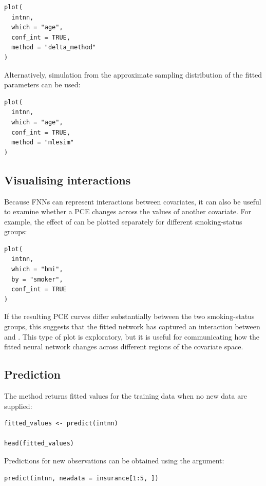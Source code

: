 \begin{verbatim}
plot(
  intnn,
  which = "age",
  conf_int = TRUE,
  method = "delta_method"
)
\end{verbatim}

Alternatively, simulation from the approximate sampling distribution of the fitted parameters can be used:

\begin{verbatim}
plot(
  intnn,
  which = "age",
  conf_int = TRUE,
  method = "mlesim"
)
\end{verbatim}

\subsection{Visualising interactions}\label{visualising-interactions}

Because FNNs can represent interactions between covariates, it can also be useful to examine whether a PCE changes across the values of another covariate.
For example, the effect of  can be plotted separately for different smoking-status groups:

\begin{verbatim}
plot(
  intnn,
  which = "bmi",
  by = "smoker",
  conf_int = TRUE
)
\end{verbatim}

If the resulting PCE curves differ substantially between the two smoking-status groups, this suggests that the fitted network has captured an interaction between  and .
This type of plot is exploratory, but it is useful for communicating how the fitted neural network changes across different regions of the covariate space.

\subsection{Prediction}\label{prediction-1}

The  method returns fitted values for the training data when no new data are supplied:

\begin{verbatim}
fitted_values <- predict(intnn)

head(fitted_values)
\end{verbatim}

Predictions for new observations can be obtained using the  argument:

\begin{verbatim}
predict(intnn, newdata = insurance[1:5, ])
\end{verbatim}

